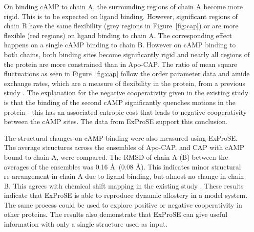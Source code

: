 On binding cAMP to chain A, the surrounding regions of chain A become more rigid.
This is to be expected on ligand binding.
However, significant regions of chain B have the same flexibility (grey regions in Figure~\ref{fig:cap}) or are more flexible (red regions) on ligand binding to chain A.
The corresponding effect happens on a single cAMP binding to chain B.
However on cAMP binding to both chains, both binding sites become significantly rigid and nearly all regions of the protein are more constrained than in Apo-CAP.
The ratio of mean square fluctuations as seen in Figure~\ref{fig:cap} follow the order parameter data and amide exchange rates, which are a measure of flexibility in the protein, from a previous study \cite{Popovych2006}.
The explanation for the negative cooperativity given in the existing study is that the binding of the second cAMP significantly quenches motions in the protein - this has an associated entropic cost that leads to negative cooperativity between the cAMP sites.
The data from ExProSE support this conclusion.

The structural changes on cAMP binding were also measured using ExProSE.
The average structures across the ensembles of Apo-CAP, and CAP with cAMP bound to chain A, were compared.
The RMSD of chain A (B) between the averages of the ensembles was 0.16 \AA\ (0.08 \AA).
This indicates minor structural re-arrangement in chain A due to ligand binding, but almost no change in chain B.
This agrees with chemical shift mapping in the existing study \cite{Popovych2006}.
These results indicate that ExProSE is able to reproduce dynamic allostery in a model system.
The same process could be used to explore positive or negative cooperativity in other proteins.
The results also demonstrate that ExProSE can give useful information with only a single structure used as input.


